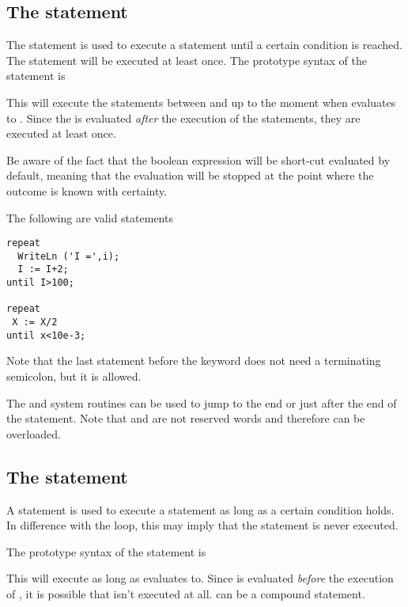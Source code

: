 \subsection{The  statement}
 
The  statement is used to execute a statement until a certain
condition is reached. The statement will be executed at least once.
The prototype syntax of the  statement is

This will execute the statements between  and  up to
the moment when  evaluates to .
Since the  is evaluated {\em after} the execution of the
statements, they are executed at least once.

Be aware of the fact that the boolean expression  will be
short-cut evaluated by default, meaning that the evaluation will be stopped
at the point where the outcome is known with certainty.

The following are valid  statements
\begin{verbatim}
repeat
  WriteLn ('I =',i);
  I := I+2;
until I>100;

repeat
 X := X/2
until x<10e-3;
\end{verbatim}
Note that the last statement before the  keyword does not need
a terminating semicolon, but it is allowed.

The  and  system routines can be used to jump to
the end or just after the end of the  statement.
Note that  and  are not reserved words and
therefore can be overloaded.

\subsection{The  statement}
 
A  statement is used to execute a statement as long as a certain
condition holds. In difference with the  loop, this may imply
that the statement is never executed.

The prototype syntax of the  statement is

This will execute  as long as  evaluates
to. Since  is evaluated {\em before} the execution
of , it is possible that  isn't executed at
all.  can be a compound statement.

